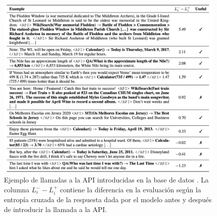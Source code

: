 \begin{figure}[tb]
    \centering
    \includegraphics[width=\textwidth]{figures/chapter3/toolformer.png}
    \caption{Ejemplo de llamadas a la API introducidas en la base de datos \cite{schick2023toolformer}. La columna \(L_i^- - L_i^+ \) contiene la diferencia en la evaluación según la entropía cruzada de la respuesta dada por el modelo antes y después de introducir la llamada a la API. \cite{schick2023toolformer}}
    \label{fig:toolformer}
\end{figure}


